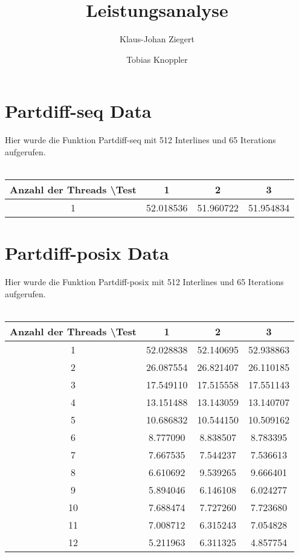 \documentclass[a4paper,11pt]{scrartcl}
\title{Leistungsanalyse}
\author{Klaus-Johan Ziegert \and Tobias Knoppler}
\begin{document}
\maketitle
\section{Partdiff-seq Data}
Hier wurde die Funktion Partdiff-seq mit 512 Interlines und 65 Iterations aufgerufen.\\
\\
\begin{tabular}{|c|c|c|c|}            \hline
Anzahl der Threads \textbackslash Test & 1 & 2 & 3 \\ \hline
1 & 52.018536 &     51.960722 &  51.954834\\
\hline
\end{tabular}

\section{Partdiff-posix Data}

Hier wurde die Funktion Partdiff-posix mit 512 Interlines und 65 Iterations aufgerufen.\\
\\

\begin{tabular}{|c|c|c|c|}            \hline
Anzahl der Threads \textbackslash Test & 1 & 2 & 3 \\ \hline
1 & 52.028838 &     52.140695 &     52.938863\\
2  & 26.087554 &     26.821407 &      26.110185\\
3   & 17.549110 &     17.515558 &     17.551143\\
4   & 13.151488 &     13.143059  &    13.140707\\
5  & 10.686832 &     10.544150  &    10.509162 \\
6 &  8.777090  &    8.838507  &    8.783395  \\
7  & 7.667535  &    7.544237 &     7.536613  \\
8  &  6.610692 &     9.539265 &     9.666401 \\
9  &  5.894046 &     6.146108 &     6.024277 \\
10  &  7.688474  &    7.727260 &     7.723680\\
11  &  7.008712 &     6.315243 &     7.054828\\
12  &  5.211963  &    6.311325   &   4.857754\\
\hline
\end{tabular}
\end{document}
